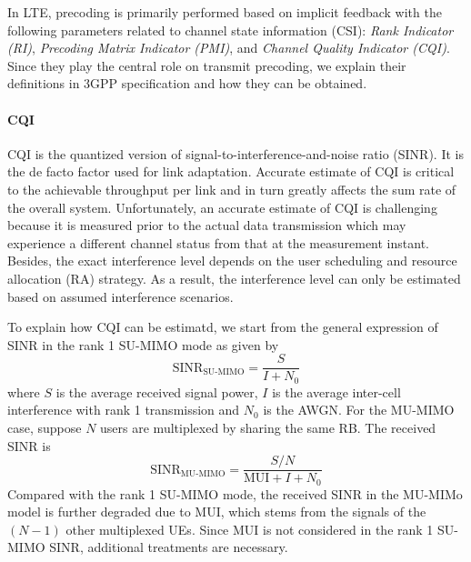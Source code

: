 \documentclass[a4paper,12pt]{article}%
\begin{document}
In LTE, precoding is primarily performed based on implicit
feedback with the following parameters related to channel state information (CSI): \emph{Rank Indicator (RI)}, \emph{Precoding Matrix Indicator (PMI)}, and \emph{Channel Quality Indicator (CQI)}. Since they play the central role on transmit precoding, we explain their definitions in 3GPP specification and how they can be obtained.


\paragraph{CQI} 

CQI is the quantized version of signal-to-interference-and-noise ratio (SINR). It is the de facto factor used for link adaptation. Accurate estimate of CQI is critical to the achievable throughput per link and in turn greatly affects the sum rate of the overall system. Unfortunately, an accurate estimate of CQI is challenging because it is measured prior to the actual data transmission which may experience a different channel status from that at the measurement instant. Besides, the exact interference level depends on the user scheduling and resource allocation (RA) strategy. As a result, the interference level can only be estimated based on assumed interference scenarios.

To explain how CQI can be estimatd, we start from the general expression of SINR in the rank 1 SU-MIMO mode as given by
\begin{equation}\label{eq:sinr-su}
\text{SINR}_{\text{SU-MIMO}} = \frac{S}{I+N_0}
\end{equation}
where $S$ is the average received signal power, $I$ is the average inter-cell interference with rank 1 transmission and $N_0$ is the AWGN. For the MU-MIMO case, suppose $N$ users are multiplexed by sharing the same RB. The received SINR is
\begin{equation}\label{eq:sinr-mu}
\text{SINR}_{\text{MU-MIMO}} = \frac{S/N}{\text{MUI}+I+N_0}
\end{equation}
Compared with the rank 1 SU-MIMO mode, the received SINR in the MU-MIMo model is further degraded due to MUI, which stems from  the signals of the $(N-1)$ other multiplexed UEs. Since MUI is not considered in the rank 1 SU-MIMO SINR, additional treatments are necessary. 
\end{document}
